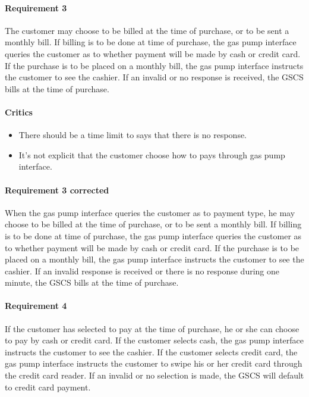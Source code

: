 \paragraph{Requirement 3} The customer may choose to be billed at the time
of purchase, or to be sent a monthly bill. If billing is to be done at time
of purchase, the gas pump interface queries the customer as to whether
payment will be made by cash or credit card. If the purchase is to be placed
on a monthly bill, the gas pump interface instructs the customer to see the
cashier. If an invalid or no response is received, the GSCS bills at the
time of purchase.

\begin{framed}
    \paragraph{Critics}
    \begin{itemize}
        \item There should be a time limit to says that there is no
            response.
        \item It's not explicit that the customer choose how to pays
            through gas pump interface.
    \end{itemize}

    \paragraph{Requirement 3 corrected} When the gas pump interface queries the
    customer as to payment type, he may choose to be billed at the
    time of purchase, or to be sent a monthly bill.
    If billing is to be done at time of purchase, the gas pump
    interface queries the customer as to whether payment will be
    made by cash or credit card. If the purchase is to be placed on
    a monthly bill, the gas pump interface instructs the customer to
    see the cashier. If an invalid response is received or there is
    no response during one minute, the GSCS bills at the time of purchase.
\end{framed}

\paragraph{Requirement 4} If the customer has selected to pay at the time of
purchase, he or she can choose to pay by cash or credit card. If the
customer selects cash, the gas pump interface instructs the customer to see
the cashier. If the customer selects credit card, the gas pump interface
instructs the customer to swipe his or her credit card through the credit
card reader. If an invalid or no selection is made, the GSCS will default
to credit card payment.

